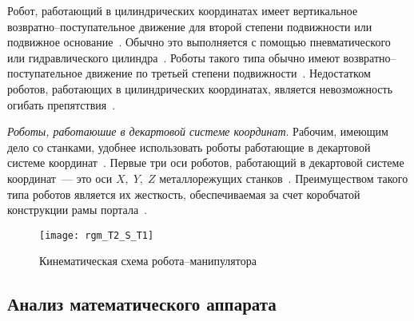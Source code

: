 \documentclass[oneside, final, 14pt]{extarticle}
\begin{document}
Робот, работающий в цилиндрических координатах имеет вертикальное возвратно--поступательное движение для второй степени подвижности или подвижное основание~\cite{asfal:rob_auto}.
Обычно это выполняется с помощью пневматического или гидравлического цилиндра~\cite{asfal:rob_auto}.
Роботы такого типа обычно имеют возвратно--поступательное движение по третьей степени подвижности~\cite{asfal:rob_auto}.
Недостатком роботов, работающих в цилиндрических координатах, является невозможность огибать препятствия~\cite{asfal:rob_auto}.
\par
{\itshape Роботы, работаюшие в декартовой системе координат}.
Рабочим, имеющим дело со станками, удобнее использовать роботы работающие в декартовой системе координат~\cite{asfal:rob_auto}.
Первые три оси роботов, работающий в декартовой системе координат~--- это оси \(X,\;Y,\;Z\) металлорежущих станков~\cite{asfal:rob_auto}.
Преимуществом такого типа роботов является их жесткость, обеспечиваемая за счет коробчатой конструкции рамы портала~\cite{asfal:rob_auto}.
\begin{figure}[t]
  \centering
  \texttt{[image: rgm\_T2\_S\_T1]}
  \caption{Кинематическая схема робота--манипулятора}
  \label{i:rgm_T2_S_T1}
\end{figure}

\subsection{Анализ математического аппарата}
\end{document}
